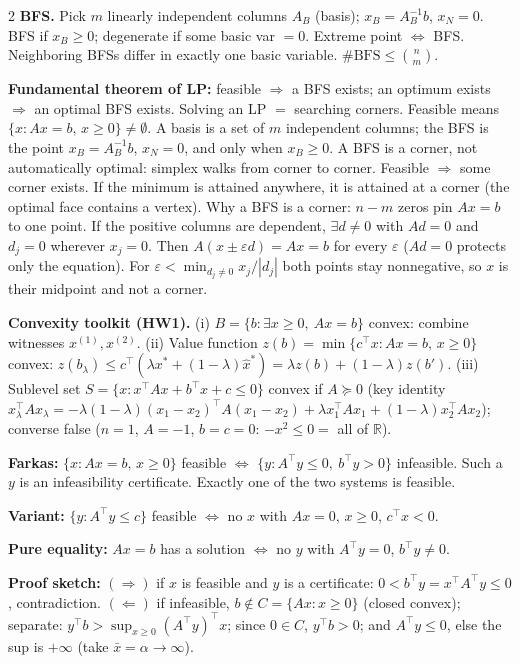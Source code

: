 \documentclass{article}
\newcommand{\sect}[1]{\par\vspace{1.2pt}{\fontsize{8}{9.2}\selectfont\textbf{#1}}\par\vspace{0.2pt}}
\newcommand{\kw}[1]{\textbf{#1}}
\begin{document}
\begin{multicols}{2}
\kw{BFS.} Pick $m$ linearly independent columns $A_B$ (basis); $x_B=A_B^{-1}b$, $x_N=0$. BFS if $x_B\ge 0$; degenerate if some basic var $=0$. Extreme point $\Leftrightarrow$ BFS. Neighboring BFSs differ in exactly one basic variable. $\#\mathrm{BFS}\le\binom{n}{m}$.

\kw{Fundamental theorem of LP:} feasible $\Rightarrow$ a BFS exists; an optimum exists $\Rightarrow$ an optimal BFS exists. Solving an LP $=$ searching corners. Feasible means $\{x:Ax=b,\,x\ge 0\}\neq\emptyset$. A basis is a set of $m$ independent columns; the BFS is the point $x_B=A_B^{-1}b$, $x_N=0$, and only when $x_B\ge 0$. A BFS is a corner, not automatically optimal: simplex walks from corner to corner. Feasible $\Rightarrow$ some corner exists. If the minimum is attained anywhere, it is attained at a corner (the optimal face contains a vertex). Why a BFS is a corner: $n-m$ zeros pin $Ax=b$ to one point. If the positive columns are dependent, $\exists d\neq 0$ with $Ad=0$ and $d_j=0$ wherever $x_j=0$. Then $A(x\pm\varepsilon d)=Ax=b$ for every $\varepsilon$ ($Ad=0$ protects only the equation). For $\varepsilon<\min_{d_j\neq 0}x_j/|d_j|$ both points stay nonnegative, so $x$ is their midpoint and not a corner.

\kw{Convexity toolkit (HW1).} (i) $B=\{b:\exists x\ge 0,\ Ax=b\}$ convex: combine witnesses $x^{(1)},x^{(2)}$. (ii) Value function $z(b)=\min\{c^\top x:Ax=b,\,x\ge 0\}$ convex: $z(b_\lambda)\le c^\top(\lambda x^*+(1-\lambda)\hat x^*)=\lambda z(b)+(1-\lambda)z(b')$. (iii) Sublevel set $S=\{x:x^\top Ax+b^\top x+c\le 0\}$ convex if $A\succeq 0$ (key identity $x_\lambda^\top Ax_\lambda=-\lambda(1-\lambda)(x_1-x_2)^\top A(x_1-x_2)+\lambda x_1^\top Ax_1+(1-\lambda)x_2^\top Ax_2$); converse false ($n=1$, $A=-1$, $b=c=0$: $-x^2\le 0=$ all of $\mathbb{R}$).

\sect{2. Farkas' Lemma \& Certificates}
\kw{Farkas:} $\{x:Ax=b,\,x\ge 0\}$ feasible $\Leftrightarrow$ $\{y:A^\top y\le 0,\ b^\top y>0\}$ infeasible. Such a $y$ is an infeasibility certificate. Exactly one of the two systems is feasible.

\kw{Variant:} $\{y:A^\top y\le c\}$ feasible $\Leftrightarrow$ no $x$ with $Ax=0$, $x\ge 0$, $c^\top x<0$.

\kw{Pure equality:} $Ax=b$ has a solution $\Leftrightarrow$ no $y$ with $A^\top y=0$, $b^\top y\neq 0$.

\kw{Proof sketch:} $(\Rightarrow)$ if $x$ is feasible and $y$ is a certificate: $0<b^\top y=x^\top A^\top y\le 0$, contradiction. $(\Leftarrow)$ if infeasible, $b\notin C=\{Ax:x\ge 0\}$ (closed convex); separate: $y^\top b>\sup_{x\ge 0}(A^\top y)^\top x$; since $0\in C$, $y^\top b>0$; and $A^\top y\le 0$, else the sup is $+\infty$ (take $\bar x=\alpha\to\infty$).


\end{multicols}
\end{document}
